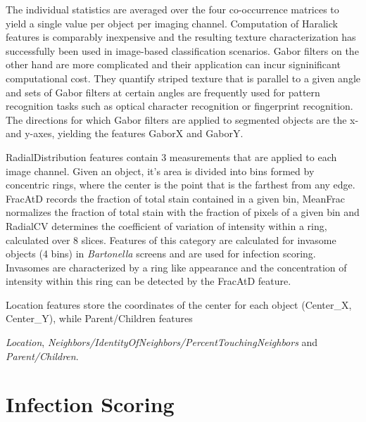 The individual statistics are averaged over the four co-occurrence matrices to yield a single value per object per imaging channel. Computation of Haralick features is comparably inexpensive and the resulting texture characterization has successfully been used in image-based classification scenarios. Gabor filters on the other hand are more complicated and their application can incur signinificant computational cost. They quantify striped texture that is parallel to a given angle and sets of Gabor filters at certain angles are frequently used for pattern recognition tasks such as optical character recognition or fingerprint recognition. The directions for which Gabor filters are applied to segmented objects are the x- and y-axes, yielding the features GaborX and GaborY.

RadialDistribution features contain 3 measurements that are applied to each image channel. Given an object, it's area is divided into bins formed by concentric rings, where the center is the point that is the farthest from any edge. FracAtD records the fraction of total stain contained in a given bin, MeanFrac normalizes the fraction of total stain with the fraction of pixels of a given bin and RadialCV determines the coefficient of variation of intensity within a ring, calculated over 8 slices. Features of this category are calculated for invasome objects (4 bins) in \textit{Bartonella} screens and are used for infection scoring. Invasomes are characterized by a ring like appearance and the concentration of intensity within this ring can be detected by the FracAtD feature.

Location features store the coordinates of the center for each object (Center_X, Center_Y), while Parent\slash Children features 

\textit{Location}, \textit{Neighbors\slash IdentityOfNeighbors\slash Per\-centTouchingNeighbors} and \textit{Parent\slash Children}.

\section{Infection Scoring}
\label{sec:infection-scoring}

